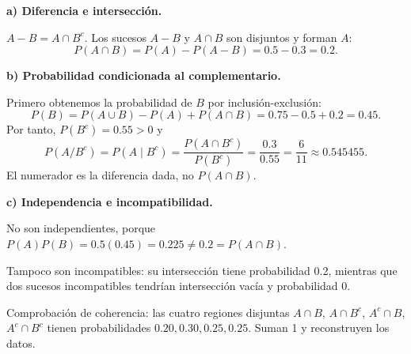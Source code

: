 \textbf{a) Diferencia e intersección.}\par\nopagebreak[4]
$A-B=A\cap B^c$. Los sucesos $A-B$ y $A\cap B$ son disjuntos y forman $A$:
\[
P(A\cap B)=P(A)-P(A-B)=0.5-0.3=\boxed{0.2}.
\]

\textbf{b) Probabilidad condicionada al complementario.}\par\nopagebreak[4]
Primero obtenemos la probabilidad de $B$ por inclusión-exclusión:
\[
P(B)=P(A\cup B)-P(A)+P(A\cap B)=0.75-0.5+0.2=0.45.
\]
Por tanto, $P(B^c)=0.55>0$ y
\[
P(A/B^c)=P(A\mid B^c)=\frac{P(A\cap B^c)}{P(B^c)}
=\frac{0.3}{0.55}=\boxed{\frac6{11}\approx0.545455}.
\]
El numerador es la diferencia dada, no $P(A\cap B)$.

\textbf{c) Independencia e incompatibilidad.}\par\nopagebreak[4]
No son independientes, porque $P(A)P(B)=0.5(0.45)=0.225\ne0.2=P(A\cap B)$.

Tampoco son incompatibles: su intersección tiene probabilidad 0.2, mientras que dos sucesos incompatibles tendrían intersección vacía y probabilidad 0.

Comprobación de coherencia: las cuatro regiones disjuntas $A\cap B$, $A\cap B^c$, $A^c\cap B$, $A^c\cap B^c$ tienen probabilidades $0.20,0.30,0.25,0.25$. Suman 1 y reconstruyen los datos.
